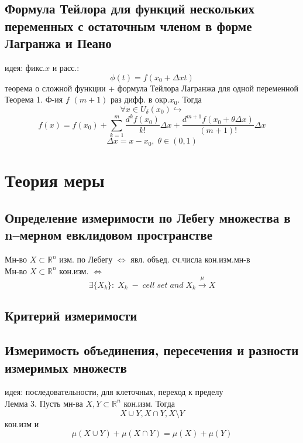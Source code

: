\documentclass{article}
\begin{document}
\subsection{Формула Тейлора для функций нескольких переменных с остаточным членом в форме Лагранжа и Пеано}
идея: фикс.$x$ и расс.: \\
\begin{equation*}
    \phi (t) = f(x_0+ \Delta x t)
\end{equation*}
теорема о сложной функции + формула Тейлора Лагранжа для одной переменной \\
Теорема 1. Ф-ия $f$ $(m+1)$ раз дифф. в окр.$x_0$. Тогда
\begin{equation*}
    \forall x \in U_\delta(x_0) \hookrightarrow
\end{equation*}
\begin{equation*}
    f(x) = f(x_0) + \sum_{k=1}^{m} \frac{d^k f(x_0)}{k!} \Delta x + \frac{d^{m+1} f(x_0+ \theta \Delta x)}{(m+1)!} \Delta x
\end{equation*}
\begin{equation*}
    \Delta x = x - x_0, \; \theta \in (0, 1)
\end{equation*}


\section{Теория меры}

\subsection{Определение измеримости по Лебегу множества в n–мерном евклидовом пространстве}
Мн-во $X \subset \mathbb R^n$ изм. по Лебегу $\Leftrightarrow$ явл. объед. сч.числа кон.изм.мн-в \\
Мн-во $X \subset \mathbb R^n$ кон.изм. $\Leftrightarrow$
\begin{equation*}
    \exists \{ X_k \}: \; X_k \; - \; cell \; set \; and \; X_k \overset{\mu}{\rightarrow} X
\end{equation*}
\subsection{Критерий измеримости}
\subsection{Измеримость объединения, пересечения и разности измеримых множеств}
идея: последовательности, для клеточных, переход к пределу \\
Лемма 3. Пусть мн-ва $X,Y \subset \mathbb R^n$ кон.изм. Тогда
\begin{equation*}
    X \cup Y, X \cap Y, X \setminus Y
\end{equation*}
кон.изм и
\begin{equation*}
    \mu (X \cup Y) + \mu (X \cap Y) = \mu (X) + \mu (Y)
\end{equation*}
\end{document}
